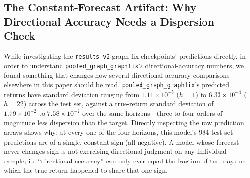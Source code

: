 \documentclass[journal]{IEEEtran}
\begin{document}
\subsection{The Constant-Forecast Artifact: Why Directional Accuracy Needs a Dispersion Check}
\label{sec:constantforecast}

While investigating the \texttt{results\_v2} graph-fix checkpoints' predictions directly, in order to understand \texttt{pooled\_graph\_graphfix}'s directional-accuracy numbers, we found something that changes how several directional-accuracy comparisons elsewhere in this paper should be read. \texttt{pooled\_graph\_graphfix}'s predicted returns have standard deviation ranging from $1.11\times10^{-5}$ ($h=1$) to $6.33\times10^{-4}$ ($h=22$) across the test set, against a true-return standard deviation of $1.79\times10^{-2}$ to $7.58\times10^{-2}$ over the same horizons---three to four orders of magnitude less dispersion than the target. Directly inspecting the raw prediction arrays shows why: at every one of the four horizons, this model's 984 test-set predictions are of a single, constant sign (all negative). A model whose forecast never changes sign is not exercising directional judgment on any individual sample; its ``directional accuracy'' can only ever equal the fraction of test days on which the true return happened to share that one sign.
\end{document}
